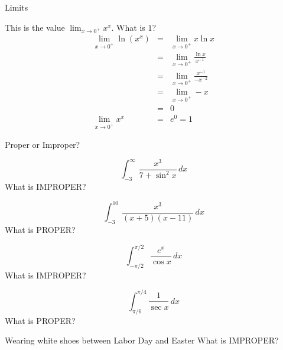 \documentclass{article}
\begin{document}
\begin{category}{Limits}
  \begin{clue}
    This is the value $\displaystyle\lim_{x\to 0^{+}}x^x.$
  \response
    What is $1$?
  \solution
    \[
    \begin{array}{rcl}
    {\displaystyle \lim_{x\to 0^{+}}\ln (x^{x})} & = & {\displaystyle \lim_{x\to 0^{+}}x\ln x} \\
    & = & {\displaystyle \lim_{x\to 0^{+}}\frac{\ln x}{x^{-1}}}\\
    & = & {\displaystyle \lim_{x\to 0^{+}}\frac{x^{-1}}{-x^{-2}}}\\
    & = & {\displaystyle \lim_{x\to 0^{+}}-x}\\
    & = & 0\\
    {\displaystyle \lim_{x\to 0^{+}} x^{x}} & = & e^{0}=1
    \end{array}
    \]
  \end{clue}

\end{category}

\begin{category}{Proper or Improper?}

  \begin{clue}
    \[ \int_{-3}^{\infty} \frac{x^{3}}{7+ \sin^{2} x} \, dx \]
  \response
    What is IMPROPER?
  \end{clue}

  \begin{clue}
    \[ \int_{-3}^{10} \frac{x^{3}}{(x+5)(x-11)} \, dx \]
  \response
    What is PROPER?
  \end{clue}

  \begin{clue}
    \[ \int_{-\pi/2}^{\pi/2} \frac{e^{x}}{\cos x} \, dx \]
  \response
    What is IMPROPER?
  \end{clue}

  \begin{clue}
    \[ \int_{\pi/6}^{\pi/4} \frac{1}{\sec x} \, dx \]
  \response
    What is PROPER?
  \end{clue}

  \begin{clue}
    Wearing white shoes between Labor Day and Easter
  \response
    What is IMPROPER?
  \end{clue}

\end{category}
\end{document}
